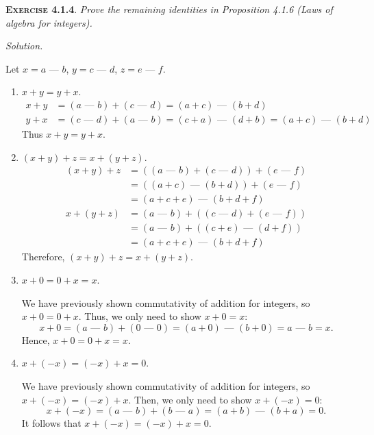 \documentclass[12pt]{article}
\newcommand{\minus}{\textrm{ --- }}
\theoremstyle{remark}
\newenvironment{exer}[2]{
    \noindent \setlength{\parskip}{1em}%
    \textsc{\textbf{Exercise #1}}. \textit{#2} \par
    \noindent \textit{Solution.} %
}{\bigskip}
\begin{document}
\begin{exer}{4.1.4}{
    Prove the remaining identities in Proposition 4.1.6 (Laws of algebra for integers).
}
    Let $x = a \minus b$, $y = c \minus d$, $z = e \minus f$.
    \begin{enumerate}[topsep=0mm,label=(\alph*)]
        \item $x + y = y + x$.
            \begin{align*}
                x + y
                &= (a \minus b) + (c \minus d)
                = (a + c) \minus (b + d) \\
                y + x
                &= (c \minus d) + (a \minus b)
                = (c + a) \minus (d + b)
                = (a + c) \minus (b + d)
            \end{align*}
            Thus $x + y = y + x$.
            
        \item $(x + y) + z = x + (y + z)$.
            \begin{align*}
                (x + y) + z
                &= ((a \minus b) + (c \minus d)) + (e \minus f) \\
                &= ((a + c) \minus (b + d)) + (e \minus f) \\
                &= (a + c + e) \minus (b + d + f) \\
                x + (y + z)
                &= (a \minus b) + ((c \minus d) + (e \minus f)) \\
                &= (a \minus b) + ((c + e) \minus (d + f)) \\
                &= (a + c + e) \minus (b + d + f)
            \end{align*}
            Therefore, $(x + y) + z = x + (y + z)$.
            
        \item $x + 0 = 0 + x = x$.
        
            We have previously shown commutativity of addition for integers, so $x + 0 = 0 + x$.
            Thus, we only need to show $x + 0 = x$:
            \[
                x + 0 = (a \minus b) + (0 \minus 0) = (a + 0) \minus (b + 0) = a \minus b = x.
            \]
            Hence, $x + 0 = 0 + x = x$.
            
        \item $x + (-x) = (-x) + x = 0$.
        
            We have previously shown commutativity of addition for integers, so $x + (-x) = (-x) + x$.
            Then, we only need to show $x + (-x) = 0$:
            \[
                x + (-x) = (a \minus b) + (b \minus a) = (a + b) \minus (b + a) = 0.
            \]
            It follows that $x + (-x) = (-x) + x = 0$.
            

\end{enumerate}
\end{exer}
\end{document}
